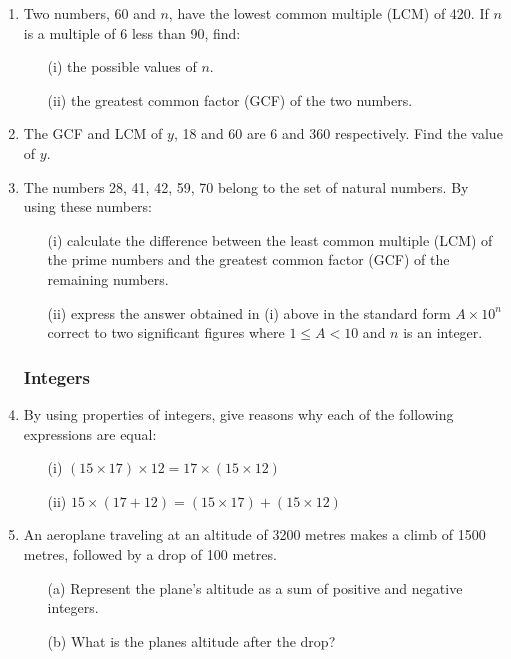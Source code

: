 \begin{enumerate}
	\item Two numbers, 60 and $n$, have the lowest common multiple (LCM) of 420. If $n$ is a multiple of 6 less than 90, find:
		\begin{itemize}
		\item[(i)] the possible values of $n$.
		\item[(ii)] the greatest common factor (GCF) of the two numbers.
		\end{itemize}	
		
	\item The GCF and LCM of $y$, 18 and 60 are 6 and 360 respectively. Find the value of $y$.
		
	\item The numbers 28, 41, 42, 59, 70 belong to the set of natural numbers. By using these numbers:
		\begin{itemize}
		\item[(i)] calculate the difference between the least common multiple (LCM) of the prime numbers and the greatest common factor (GCF) of the remaining numbers.
		\item[(ii)] express the answer obtained in (i) above in the standard form $A \times 10^n$ correct to two significant figures where $1 \leq A < 10$ and $n$ is an integer.
		\end{itemize}			 
	
	
			\subsubsection{Integers}
	\item By using properties of integers, give reasons why each of the following expressions are equal:
		\begin{itemize}
		\item[(i)] $(15 \times 17) \times 12 = 17 \times (15 \times 12)$
		\item[(ii)] $15 \times (17 + 12) = (15 \times 17) + (15 \times 12)$
		\end{itemize}
		
	\item An aeroplane traveling at an altitude of 3200 metres makes a climb of 1500 metres, followed by a drop of 100 metres.
		\begin{itemize}
		\item[(a)] Represent the plane's altitude as a sum of positive and negative integers.
		\item[(b)] What is the planes altitude after the drop?
		\end{itemize}
	


\end{enumerate}
